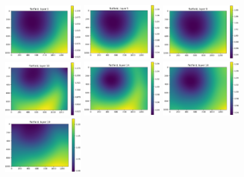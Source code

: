 \documentclass[letterpaper,11pt]{article}
\begin{document}
\begin{figure}[!ht]
\centering
\includegraphics[width=0.3\textwidth]{images/methods/flatfield_layers_vectra/flatfield_layer_1}
\includegraphics[width=0.3\textwidth]{images/methods/flatfield_layers_vectra/flatfield_layer_5}
\includegraphics[width=0.3\textwidth]{images/methods/flatfield_layers_vectra/flatfield_layer_9}
\includegraphics[width=0.3\textwidth]{images/methods/flatfield_layers_vectra/flatfield_layer_10}
\includegraphics[width=0.3\textwidth]{images/methods/flatfield_layers_vectra/flatfield_layer_14}
\includegraphics[width=0.3\textwidth]{images/methods/flatfield_layers_vectra/flatfield_layer_18}
\includegraphics[width=0.3\textwidth]{images/methods/flatfield_layers_vectra/flatfield_layer_19}

\end{figure}
\end{document}
